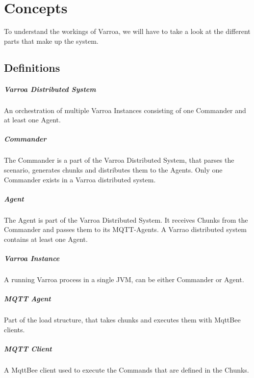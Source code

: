 \chapter{Concepts}
To understand the workings of Varroa, we will have to take a look at the different parts that make up the system.


\section{Definitions}

\paragraph{Varroa Distributed System}
An orchestration of multiple Varroa Instances consisting of one Commander and at least one Agent.

\paragraph{Commander}
The Commander is a part of the Varroa Distributed System, that parses the scenario, generates chunks and distributes them to the Agents.
Only one Commander exists in a Varroa distributed system.

\paragraph{Agent}
The Agent is part of the Varroa Distributed System.
It receives Chunks from the Commander and passes them to its MQTT-Agents.
A Varrao distributed system contains at least one Agent.

\paragraph{Varroa Instance}
A running Varroa process in a single JVM, can be either Commander or Agent.

\paragraph{MQTT Agent}
Part of the load structure, that takes chunks and executes them with MqttBee clients.

\paragraph{MQTT Client}
A MqttBee client used to execute the Commands that are defined in the Chunks.

